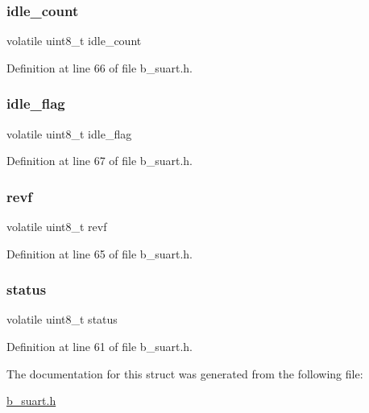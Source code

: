 \mbox{\label{struct_s___r_x_info__t_a2fca36c37bbd385665d8d422df068370}} 
\subsubsection{\texorpdfstring{idle\+\_\+count}{idle\_count}}
{\footnotesize\ttfamily volatile uint8\+\_\+t idle\+\_\+count}



Definition at line 66 of file b\+\_\+suart.\+h.

\mbox{\label{struct_s___r_x_info__t_a02fecce62db76d446cceec8d87e330f9}} 
\subsubsection{\texorpdfstring{idle\+\_\+flag}{idle\_flag}}
{\footnotesize\ttfamily volatile uint8\+\_\+t idle\+\_\+flag}



Definition at line 67 of file b\+\_\+suart.\+h.

\mbox{\label{struct_s___r_x_info__t_a34ed48d0499d28be718165306a573aeb}} 
\subsubsection{\texorpdfstring{revf}{revf}}
{\footnotesize\ttfamily volatile uint8\+\_\+t revf}



Definition at line 65 of file b\+\_\+suart.\+h.

\mbox{\label{struct_s___r_x_info__t_afea475b453c81c5b3f5a31abb861edfb}} 
\subsubsection{\texorpdfstring{status}{status}}
{\footnotesize\ttfamily volatile uint8\+\_\+t status}



Definition at line 61 of file b\+\_\+suart.\+h.



The documentation for this struct was generated from the following file\+:\begin{DoxyCompactItemize}
\item 
\mbox{\hyperlink{b__suart_8h}{b\+\_\+suart.\+h}}\end{DoxyCompactItemize}
